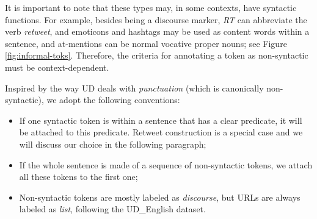 \documentclass[11pt,a4paper]{article}
\newcommand{\yjcomment}[1]{\textcolor{orange}{[$_\mathrm{L}^\mathrm{Y}$#1]}}
\newcommand{\nascomment}[1]{\textcolor{blue}{[#1 ---\textsc{nas}]}}
\newcommand{\yicomment}[1]{\textcolor{gray}{[#1 ---\textsc{Yi}]}}
\begin{document}
It is important to note that these types may, in some
contexts, have syntactic functions.
For example, besides being a discourse marker, \emph{RT} can
abbreviate the verb {\it retweet}, and emoticons and hashtags may be
used as content words within a sentence, and at-mentions can be normal vocative proper nouns; see Figure
\ref{fig:informal-toks}.  Therefore, the criteria for annotating a
token as non-syntactic must be context-dependent.


Inspired by the way UD deals with \emph{punctuation} (which is
canonically non-syntactic), we adopt the following
conventions:

\begin{itemize}
\item If one syntactic token is within a sentence that has a clear predicate, it will be attached to this predicate. Retweet construction is a special case and we will discuss our choice in the following paragraph;
\item If the whole sentence is made of a sequence of non-syntactic tokens, we attach all these tokens to the first one;
\item Non-syntactic tokens are mostly labeled as {\it discourse}, but
  URLs are always labeled as {\it list}, following the UD\_English dataset.
\end{itemize}
\end{document}
